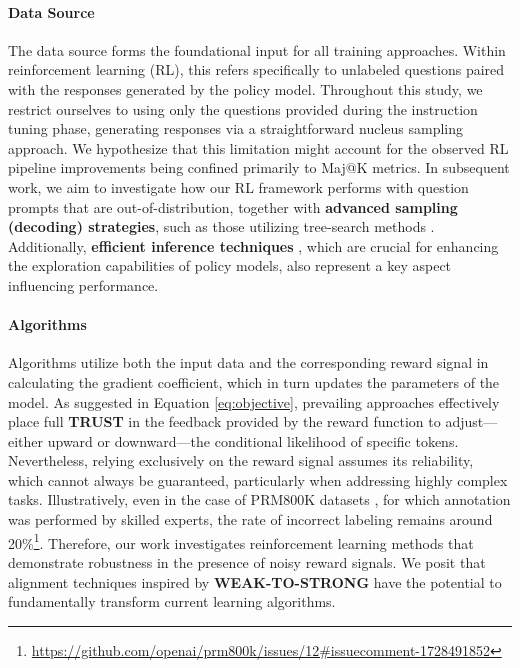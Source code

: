 \begin{itemize}[topsep=0pt]
\begin{itemize}[topsep=0pt]
\paragraph{Data Source} The data source forms the foundational input for all training approaches. Within reinforcement learning (RL), this refers specifically to unlabeled questions paired with the responses generated by the policy model. Throughout this study, we restrict ourselves to using only the questions provided during the instruction tuning phase, generating responses via a straightforward nucleus sampling approach. We hypothesize that this limitation might account for the observed RL pipeline improvements being confined primarily to Maj@K metrics. In subsequent work, we aim to investigate how our RL framework performs with question prompts that are out-of-distribution, together with \textbf{advanced sampling (decoding) strategies}, such as those utilizing tree-search methods \citep{yao2023tree}. Additionally, \textbf{efficient inference techniques} \citep{xia-etal-2023-speculative,leviathan2023fast,kwon2023efficient,xia2024unlocking}, which are crucial for enhancing the exploration capabilities of policy models, also represent a key aspect influencing performance.

\paragraph{Algorithms} Algorithms utilize both the input data and the corresponding reward signal in calculating the gradient coefficient, which in turn updates the parameters of the model. As suggested in Equation \ref{eq:objective}, prevailing approaches effectively place full \textbf{TRUST} in the feedback provided by the reward function to adjust—either upward or downward—the conditional likelihood of specific tokens. Nevertheless, relying exclusively on the reward signal assumes its reliability, which cannot always be guaranteed, particularly when addressing highly complex tasks. Illustratively, even in the case of PRM800K datasets \citep{lightman2023let}, for which annotation was performed by skilled experts, the rate of incorrect labeling remains around 20\%\footnote{\url{https://github.com/openai/prm800k/issues/12\#issuecomment-1728491852}}. Therefore, our work investigates reinforcement learning methods that demonstrate robustness in the presence of noisy reward signals. We posit that alignment techniques inspired by \textbf{WEAK-TO-STRONG} \citep{burns2023weak} have the potential to fundamentally transform current learning algorithms.


\end{itemize}
\end{itemize}
